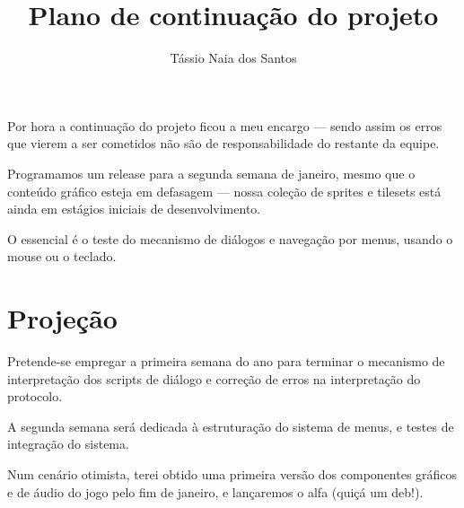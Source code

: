 \documentclass[11pt]{article}
\title{Plano de continuação do projeto}
\author{Tássio Naia dos Santos}
\begin{document}
\maketitle

Por hora a continuação do projeto ficou a meu encargo --- sendo assim os erros que vierem a ser cometidos não são de responsabilidade do restante da equipe.

Programamos um release para a segunda semana de janeiro, mesmo que o conteúdo gráfico esteja em defasagem --- nossa coleção de sprites e tilesets está ainda em estágios iniciais de desenvolvimento.

O essencial é o teste do mecanismo de diálogos e navegação por menus, usando o mouse ou o teclado.

\section{Projeção}

Pretende-se empregar a primeira semana do ano para terminar o mecanismo de interpretação dos scripts de diálogo e correção de erros na interpretação do protocolo.

A segunda semana será dedicada à estruturação do sistema de menus, e testes de integração do sistema.

Num cenário otimista, terei obtido uma primeira versão dos componentes gráficos e de áudio do jogo pelo fim de janeiro, e lançaremos o alfa (quiçá um deb!).
\end{document}
